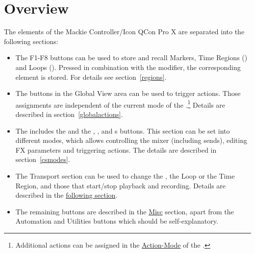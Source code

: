 \section{Overview}\label{overview}

The elements of the Mackie Controller/Icon QCon Pro X are separated
into the following sections:

\begin{itemize}

\item The F1-F8  buttons
  can be used to store and recall Markers, Time Regions (\option) and
  Loops (\alt). Pressed in combination with the \control modifier, the
  corresponding element is stored.  For details see
  section~\ref{regions}.

\item The buttons in the Global View area  can be used to trigger \reaper actions. Those
  assignments are independent of the current mode of the \fs.\footnote{Additional
  actions can be assigned in the \hyperref[actionmode]{Action-Mode} of
  the \fs.} Details are described in section~\ref{globalactions}.

\item The \fs includes the \mfader and the
  \flip, \gv, \nv and s buttons. This section can be set into
  different modes, which allows controlling the \reaper mixer
  (including sends), editing FX parameters and triggering \reaper
  actions. The details are described in section~\ref{csmodes}.
 

\item The Transport section can be used to change the \ec, the Loop or the Time Region, and
  those that start/stop playback and recording. Details are described
  in the \hyperref[transport]{following section}.

\item The remaining buttons are described in the \hyperref[misc]{Misc}
  section, apart from the Automation and Utilities buttons which should be
  self-explanatory.



\end{itemize}

